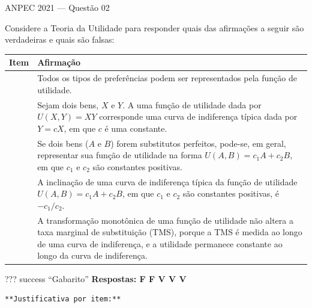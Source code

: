 \documentclass[11pt,twoside,openright]{book}
\begin{document}
\begin{infobox}{ANPEC 2021 — Questão 02}

Considere a Teoria da Utilidade para responder quais das afirmações a
seguir são verdadeiras e quais são falsas:

{\def\LTcaptype{none} %
\begin{longtable}[]{@{}
  >{\raggedright\arraybackslash}p{}
  >{\raggedright\arraybackslash}p{}@{}}
\toprule\noalign{}
\begin{minipage}[b]{\linewidth}\raggedright
Item
\end{minipage} & \begin{minipage}[b]{\linewidth}\raggedright
Afirmação
\end{minipage} \\
\midrule\noalign{}
\endhead
\bottomrule\noalign{}
\endlastfoot
0 & Todos os tipos de preferências podem ser representados pela função
de utilidade. \\
1 & Sejam dois bens, \(X\) e \(Y\). A uma função de utilidade dada por
\(U(X, Y) = XY\) corresponde uma curva de indiferença típica dada por
\(Y = cX\), em que \(c\) é uma constante. \\
2 & Se dois bens (\(A\) e \(B\)) forem substitutos perfeitos, pode-se,
em geral, representar sua função de utilidade na forma
\(U(A, B) = c_1 A + c_2 B\), em que \(c_1\) e \(c_2\) são constantes
positivas. \\
3 & A inclinação de uma curva de indiferença típica da função de
utilidade \(U(A, B) = c_1 A + c_2 B\), em que \(c_1\) e \(c_2\) são
constantes positivas, é \(-c_1/c_2\). \\
4 & A transformação monotônica de uma função de utilidade não altera a
taxa marginal de substituição (TMS), porque a TMS é medida ao longo de
uma curva de indiferença, e a utilidade permanece constante ao longo da
curva de indiferença. \\
\end{longtable}
}

??? success ``Gabarito'' \textbf{Respostas: F F V V V}

\begin{verbatim}
**Justificativa por item:**


\end{verbatim}
\end{infobox}
\end{document}
